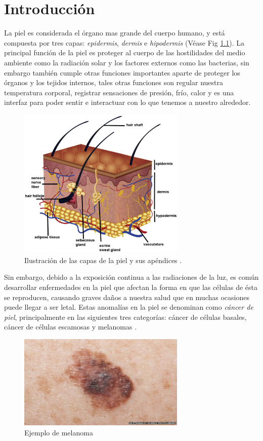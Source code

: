 
\chapter{Introducción}

La piel es considerada el órgano mas grande del cuerpo humano,  y está compuesta por tres capas: \emph{\gls{epidermis}}, \emph{\gls{dermis}} e \emph{\gls{hipodermis}} (Véase Fig \ref{fig:skin1_jpg}). La principal función de la piel es proteger al cuerpo de las hostilidades del medio ambiente como la radiación solar y los factores externos como las bacterias, sin embargo también cumple otras funciones importantes aparte de proteger los órganos y los tejidos internos, tales otras funciones son regular nuestra temperatura corporal, registrar sensaciones de presión, frío, calor y es una interfaz para poder sentir e interactuar con lo que tenemos a nuestro alrededor.


\begin{figure}[h!]
    \includegraphics[width=80mm, scale = 0.5]{Figuras/skin_structure1.jpg}
    \centering
    \caption{Ilustración de las capas de la piel y sus apéndices \citep{skin_1}.}
    \label{fig:skin1_jpg}
\end{figure}

Sin embargo, debido a la exposición continua a las radiaciones de la luz, es común desarrollar enfermedades en la piel que afectan la forma en que las células de ésta se reproducen, causando graves daños a nuestra salud que en muchas ocasiones puede llegar a ser letal. Estas anomalías en la piel se denominan como \emph{cáncer de piel}, principalmente en las siguientes tres categorías: cáncer de células basales, cáncer de células escamosas y melanomas \citep{cancer_org}.

\begin{figure}[h!]
    \includegraphics[width=80mm, scale = 0.8]{Figuras/skin_cancer_bbc.jpg}
    \centering
    \caption{Ejemplo de melanoma \citep{cancer_img_1}}
    \label{fig:can_jpg}
\end{figure}

